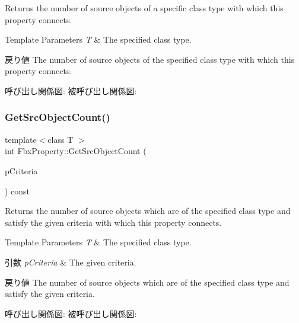 Returns the number of source objects of a specific class type with which this property connects. 
\begin{DoxyTemplParams}{Template Parameters}
{\em T} & The specified class type. \\
\hline
\end{DoxyTemplParams}
\begin{DoxyReturn}{戻り値}
The number of source objects of the specified class type with which this property connects. 
\end{DoxyReturn}
呼び出し関係図\+:
被呼び出し関係図\+:
\mbox{\label{class_fbx_property_a4a79c28a713cafebad7254bd68b05a2f}} 
\subsubsection{\texorpdfstring{Get\+Src\+Object\+Count()}{GetSrcObjectCount()}\hspace{0.1cm}{\footnotesize\ttfamily [4/4]}}
{\footnotesize\ttfamily template$<$class T $>$ \\
int Fbx\+Property\+::\+Get\+Src\+Object\+Count (\begin{DoxyParamCaption}\item[{const \hyperlink{class_fbx_criteria}{Fbx\+Criteria} \&}]{p\+Criteria }\end{DoxyParamCaption}) const}

Returns the number of source objects which are of the specified class type and satisfy the given criteria with which this property connects. 
\begin{DoxyTemplParams}{Template Parameters}
{\em T} & The specified class type. \\
\hline
\end{DoxyTemplParams}

\begin{DoxyParams}{引数}
{\em p\+Criteria} & The given criteria. \\
\hline
\end{DoxyParams}
\begin{DoxyReturn}{戻り値}
The number of source objects which are of the specified class type and satisfy the given criteria. 
\end{DoxyReturn}
呼び出し関係図\+:
被呼び出し関係図\+:
\mbox{\label{class_fbx_property_ad538b18849614ac8d6ec3031bdf8a7ea}} 
